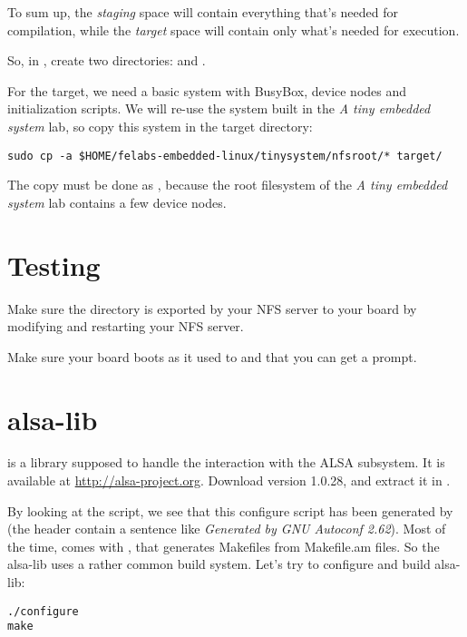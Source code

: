 To sum up, the {\em staging} space will contain everything that's
needed for compilation, while the {\em target} space will contain only
what's needed for execution.

So, in , create two
directories:  and .

For the target, we need a basic system with BusyBox, device nodes and
initialization scripts. We will re-use the system built in the {\em A
  tiny embedded system} lab, so copy this system in the target
directory:

\begin{verbatim}
sudo cp -a $HOME/felabs-embedded-linux/tinysystem/nfsroot/* target/
\end{verbatim}

The copy must be done as , because the root filesystem of
the {\em A tiny embedded system} lab contains a few device nodes.

\section{Testing}

Make sure the  directory is exported by your NFS server
to your board by modifying  and restarting your NFS
server.

Make sure your board boots as it used to and that you can get a
prompt.

\section{alsa-lib}

 is a library supposed to handle the interaction with
the ALSA subsystem. It is available at
\url{http://alsa-project.org}. Download version 1.0.28, and extract it
in .

By looking at the  script, we see that this configure
script has been generated by  (the header contain a
sentence like {\em Generated by GNU Autoconf 2.62}). Most of the time,
 comes with , that generates Makefiles
from Makefile.am files. So the alsa-lib uses a rather common build
system. Let's try to configure and build alsa-lib:

\begin{verbatim}
./configure
make
\end{verbatim}

